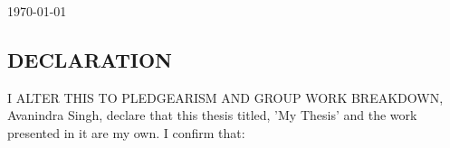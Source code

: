 \documentclass[12pt]{witseiepaper}
\begin{document}
\begin{titlepage}
\begin{center}
    {\large \today}\\[2cm]
    
  \end{center}
  \large


  \textbf{}
\end{titlepage}





 \renewcommand\thesection{\Alph{section}}
 \setcounter{section}{0}

 \thispagestyle{empty}\pagestyle{empty}
 \begin{center}
 \section{DECLARATION}
 \end{center}
I ALTER THIS TO PLEDGEARISM AND GROUP WORK BREAKDOWN, Avanindra Singh, declare that this thesis titled, 'My Thesis' and the work presented in it are my own. I confirm that:
\end{document}
